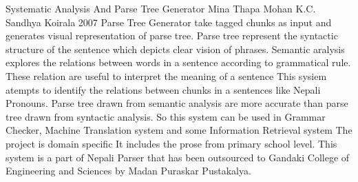  \begin{conf-abstract}[]
{Systematic Analysis And Parse Tree Generator}
{
	Mina Thapa
	Mohan K.C.
	Sandhya Koirala
}
{2007}
Parse Tree Generator take tagged chunks as input and generates visual
representation of parse tree. Parse tree represent the syntactic structure of the
sentence which depicts clear vision of phrases.
Semantic aralysis explores the relations between words in a sentence
according to grammatical rule. These relation are useful to interpret the meaning
of a sentence This sysiem atempts to identify the relations between chunks in a
sentences like Nepali Pronouns.
Parse tree drawn from semantic analysis are more accurate than parse
tree drawn from syntactic analysis. So this system can be used in Grammar
Checker, Machine Translation system and some Information Retrieval system
The project is domain specific It includes the prose from primary
school level. This system is a part of Nepali Parser that has been outsourced to
Gandaki College of Engineering and Sciences by Madan Puraskar Pustakalya.
  \end{conf-abstract}
